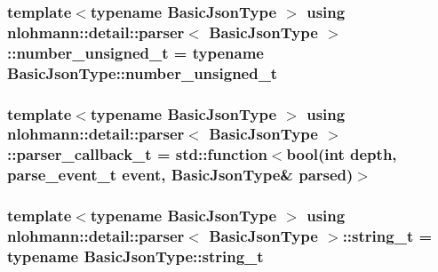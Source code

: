 \subsubsection[{\texorpdfstring{number\+\_\+unsigned\+\_\+t}{number_unsigned_t}}]{\setlength{\rightskip}{0pt plus 5cm}template$<$typename Basic\+Json\+Type $>$ using {\bf nlohmann\+::detail\+::parser}$<$ Basic\+Json\+Type $>$\+::{\bf number\+\_\+unsigned\+\_\+t} =  typename Basic\+Json\+Type\+::number\+\_\+unsigned\+\_\+t\hspace{0.3cm}{\ttfamily [private]}}\hypertarget{classnlohmann_1_1detail_1_1parser_a3773ccef366c61da2e6a8c0eda36d0ec}{}\label{classnlohmann_1_1detail_1_1parser_a3773ccef366c61da2e6a8c0eda36d0ec}
\subsubsection[{\texorpdfstring{parser\+\_\+callback\+\_\+t}{parser_callback_t}}]{\setlength{\rightskip}{0pt plus 5cm}template$<$typename Basic\+Json\+Type $>$ using {\bf nlohmann\+::detail\+::parser}$<$ Basic\+Json\+Type $>$\+::{\bf parser\+\_\+callback\+\_\+t} =  std\+::function$<$bool(int depth, {\bf parse\+\_\+event\+\_\+t} event, Basic\+Json\+Type\& parsed)$>$}\hypertarget{classnlohmann_1_1detail_1_1parser_ad250ad4f2b4af4a497e727c963162ff1}{}\label{classnlohmann_1_1detail_1_1parser_ad250ad4f2b4af4a497e727c963162ff1}
\subsubsection[{\texorpdfstring{string\+\_\+t}{string_t}}]{\setlength{\rightskip}{0pt plus 5cm}template$<$typename Basic\+Json\+Type $>$ using {\bf nlohmann\+::detail\+::parser}$<$ Basic\+Json\+Type $>$\+::{\bf string\+\_\+t} =  typename Basic\+Json\+Type\+::string\+\_\+t\hspace{0.3cm}{\ttfamily [private]}}\hypertarget{classnlohmann_1_1detail_1_1parser_af67b9b0405262c40be2b13adaab8b046}{}\label{classnlohmann_1_1detail_1_1parser_af67b9b0405262c40be2b13adaab8b046}
